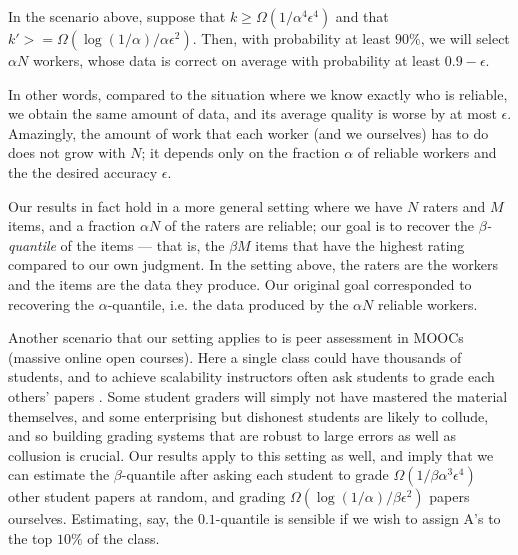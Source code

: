 \begin{theorem}
\label{thm:intro}
In the scenario above, suppose that $k \geq \Omega(1/\alpha^4\epsilon^4)$
and that $k' >= \Omega(\log(1/\alpha)/\alpha\epsilon^2)$. Then, with probability 
at least $90\%$, we will select $\alpha N$ workers, whose data is correct on 
average with probability at least $0.9-\epsilon$.
\end{theorem}
In other words, compared to the situation where we know exactly who is reliable, 
we obtain the same amount of data, and its average quality is worse by at most 
$\epsilon$. Amazingly, the amount of work that each worker (and we ourselves) has 
to do does not grow with $N$; it depends only on the fraction $\alpha$ of 
reliable workers and the the desired accuracy $\epsilon$.

Our results in fact hold in a more general setting where we have $N$ raters and 
$M$ items, and a fraction $\alpha N$ of the raters are reliable; our goal is to 
recover the \emph{$\beta$-quantile} of the items --- that is, the $\beta M$ items 
that have the highest rating compared to our own judgment. In the setting above, 
the raters are the workers and the items are the data they produce. Our original 
goal corresponded to recovering the $\alpha$-quantile, i.e. the data 
produced by the $\alpha N$ reliable workers.

Another scenario that our setting applies to is peer assessment in MOOCs (massive 
online open courses). Here a single class could have thousands of students, 
and to achieve scalability instructors often ask students to grade each others' 
papers \citep{kulkarni2015peer,piech2013tuned}. 
Some student graders will simply not have mastered the material themselves, 
and some enterprising but dishonest students are likely to collude, and 
so building grading systems that are robust to large errors as well as 
collusion is crucial. 
Our results apply to this setting as well, and imply that we can estimate the 
$\beta$-quantile after asking each student to grade 
$\Omega(1/\beta\alpha^3\epsilon^4)$ other student papers at random, and 
grading $\Omega(\log(1/\alpha)/\beta\epsilon^2)$ papers ourselves.
Estimating, say, the $0.1$-quantile is 
sensible if we wish to assign A's to the top $10\%$ of the class. 


